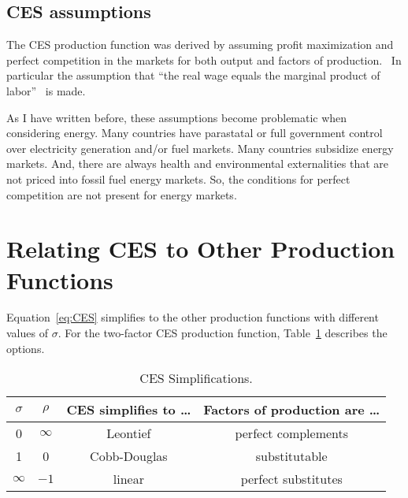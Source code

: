 \documentclass[preprint,authoryear,12pt]{elsarticle}
\begin{document}
\subsection{CES assumptions} 
\label{sec:CES_assumptions}

The CES production function was derived by assuming profit maximization
and perfect competition in the markets for both output and 
factors of production.~\citep[p.~228]{Arrow:1961aa}
In particular the assumption that 
``the real wage equals the marginal product of labor''~\citep[p.~6]{Klump:2011aa}
is made.

As I have written before, these assumptions become problematic
when considering energy.
Many countries have parastatal or full government control 
over electricity generation and/or fuel markets.  
Many countries subsidize energy markets.  
And, there are always health and environmental externalities 
that are not priced into fossil fuel energy markets.  
So, the conditions for perfect competition are not present for energy markets.


\section{Relating CES to Other Production Functions} 
\label{sec:CES-others}

Equation~\ref{eq:CES} simplifies to the other production functions 
with different values of $\sigma$.
For the two-factor CES production function, 
Table~\ref{tab:ces_simplifications} describes the options.

\begin{table}
\caption[CES Simplifications]{CES Simplifications.}
\begin{center}
 \begin{tabular}{ c c c c }
\toprule 
$\sigma$ & $\rho$ & CES simplifies to \dots & Factors of production are \dots \\
\midrule
0        & $\infty$ & Leontief              & perfect complements             \\
1        & 0        & Cobb-Douglas          & substitutable                   \\
$\infty$ & $-1$     & linear                & perfect substitutes             \\
\bottomrule
\end{tabular}
\end{center}
\label{tab:ces_simplifications}
\end{table}
\end{document}
